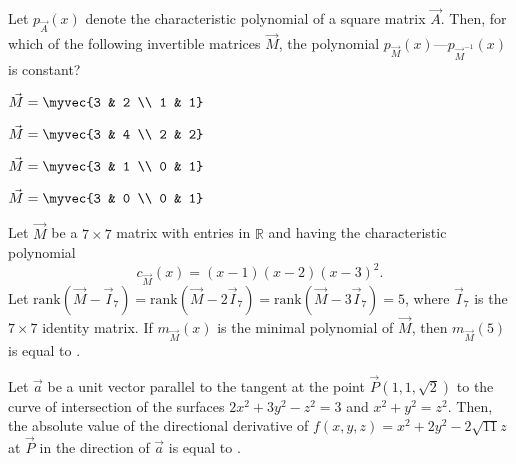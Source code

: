 \item Let $p_{\vec{A}}(x)$ denote the characteristic polynomial of a square matrix $\vec{A}$. Then, for which of the following invertible matrices $\vec{M}$, the polynomial $p_{\vec{M}}(x) — p_{\vec{M}^{-1}}(x)$ is constant?  
\hfill{}
\begin{enumerate}
\begin{multicols}{2}
\item $\vec{M} = \myvec{3 & 2 \\ 1 & 1}$
\item $\vec{M} = \myvec{3 & 4 \\ 2 & 2}$
\item $\vec{M} = \myvec{3 & 1 \\ 0 & 1}$
\item $\vec{M} = \myvec{3 & 0 \\ 0 & 1}$
\end{multicols}
\end{enumerate}  
\item Let $\vec{M}$ be a $7 \times 7$ matrix with entries in $\mathbb{R}$ and having the characteristic polynomial  
$$c_\vec{M}(x) = (x-1)(x-2)(x-3)^2.$$ 
Let $\text{rank}(\vec{M}-\vec{I}_7) = \text{rank}(\vec{M}-2\vec{I}_7) = \text{rank}(\vec{M}-3\vec{I}_7) = 5$, where $\vec{I}_7$ is the $7 \times 7$ identity matrix.  
If $m_\vec{M}(x)$ is the minimal polynomial of $\vec{M}$, then $m_{\vec{M}}(5)$ is equal to \underline{\hspace{2cm}}.  
\hfill{}
\item Let $\vec{a}$ be a unit vector parallel to the tangent at the point $\vec{P}(1,1,\sqrt{2})$ to the curve of intersection of the surfaces $2x^2+3y^2-z^2=3$ and $x^2+y^2=z^2$.  
Then, the absolute value of the directional derivative of $f(x,y,z)=x^2+2y^2-2\sqrt{11}z$ at $\vec{P}$ in the direction of $\vec{a}$ is equal to \underline{\hspace{2cm}}.  
\hfill{}

